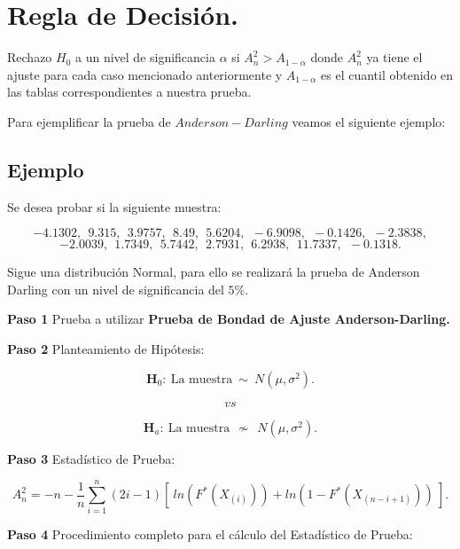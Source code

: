 \documentclass[
  a4paper,
  oneside,
  openany]{book}
\begin{document}
\hypertarget{regla-de-decisiuxf3n.-2}{%
\section{Regla de Decisión.}\label{regla-de-decisiuxf3n.-2}}

Rechazo \(H_0\) a un nivel de significancia \(\alpha\) si \(A_{n}^2> A_{1-\alpha}\) donde \(A_{n}^{2}\) ya tiene el ajuste para cada caso mencionado anteriormente y \(A_{1-\alpha}\) es el cuantil obtenido en las tablas correspondientes a nuestra prueba.

Para ejemplificar la prueba de \(Anderson-Darling\) veamos el siguiente ejemplo:

\hypertarget{ejemplo-16}{%
\subsection{Ejemplo}\label{ejemplo-16}}

Se desea probar si la siguiente muestra:

\[-4.1302,\ \ 9.315,\ \ 3.9757,\ \ 8.49,\ \ 5.6204,\ \ -6.9098,\ \ -0.1426,\ \ -2.3838,\]
\[-2.0039,\ \ 1.7349,\ \ 5.7442,\ \ 2.7931,\ \ 6.2938,\ \ 11.7337,\ \ -0.1318.\]

Sigue una distribución Normal, para ello se realizará la prueba de Anderson Darling con un nivel de significancia del \(5\%\).

\textbf{Paso 1} Prueba a utilizar \textbf{Prueba de Bondad de Ajuste Anderson-Darling.}

\textbf{Paso 2} Planteamiento de Hipótesis:

\[\textbf{H}_0: \ \mbox{La muestra} \ \sim \  N(\mu,\sigma^2).\]

\[vs\]

\[\textbf{H}_a: \ \mbox{La muestra} \ \ \nsim \ \  N(\mu,\sigma^2).\]

\textbf{Paso 3} Estadístico de Prueba:

\[A_n^2=-n-\frac{1}{n}\sum_{i=1}^{n}\left(2i-1\right)[ \ ln(F^*(X_{(i)})) +ln(1-F^*(X_{(n-i+1)})) \ ].\]

\textbf{Paso 4} Procedimiento completo para el cálculo del Estadístico de Prueba:
\end{document}
